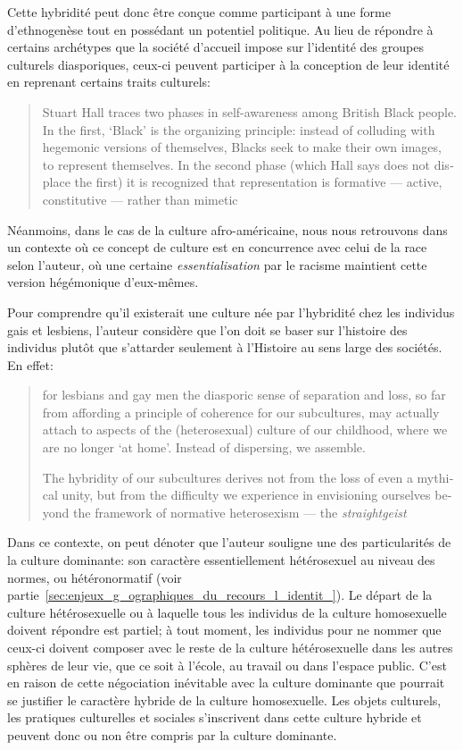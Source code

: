 Cette hybridité peut donc être conçue comme participant à une forme d'ethnogenèse tout en possédant un potentiel politique.
Au lieu de répondre à certains archétypes que la société d'accueil impose sur l'identité des groupes culturels diasporiques, ceux-ci peuvent participer à la conception de leur identité en reprenant certains traits culturels:
\foreignblockquote{english}[{\cite[277]{Sinfield1996}}][.]{Stuart Hall traces two phases in self-awareness among British Black people. In the first, `Black' is the organizing principle: instead of colluding with hegemonic versions of themselves, Blacks seek to make their own images, to represent themselves. In the second phase (which Hall says does not displace the first) it is recognized that representation is formative --- active, constitutive --- rather than mimetic}.
Néanmoins, dans le cas de la culture afro-américaine, nous nous retrouvons dans un contexte où ce concept de culture est en concurrence avec celui de la race selon l'auteur, où une certaine \emph{essentialisation} par le racisme maintient cette version hégémonique d'eux-mêmes.


Pour comprendre qu'il existerait une culture née par l'hybridité chez les individus gais et lesbiens, l'auteur considère que l'on doit se baser sur l'histoire des individus plutôt que s'attarder seulement à l'Histoire au sens large des sociétés.
En effet: \foreignblockquote{english}[{\cite[280]{Sinfield1996}}][.]{\textelp{} for lesbians and gay men the diasporic sense of separation and loss, so far from affording a principle of coherence for our subcultures, may actually attach to aspects of the (heterosexual) culture of our childhood, where we are no longer `at home'. Instead of dispersing, we assemble.

The hybridity of our subcultures derives not from the loss of even a mythical unity, but from the difficulty we experience in envisioning ourselves beyond the framework of normative heterosexism --- the \emph{straightgeist} \textelp{}}
Dans ce contexte, on peut dénoter que l'auteur souligne une des particularités de la culture dominante: son caractère essentiellement hétérosexuel au niveau des normes, ou hétéronormatif (voir partie~\ref{sec:enjeux_g_ographiques_du_recours_l_identit_}).
Le départ de la culture hétérosexuelle ou  à laquelle tous les individus de la culture homosexuelle doivent répondre est partiel; à tout moment, les individus \lgbt{} pour ne nommer que ceux-ci doivent composer avec le reste de la culture hétérosexuelle dans les autres sphères de leur vie, que ce soit à l'école, au travail ou dans l'espace public.
C'est en raison de cette négociation inévitable avec la culture dominante que pourrait se justifier le caractère hybride de la culture homosexuelle.
Les objets culturels, les pratiques culturelles et sociales s'inscrivent dans cette culture hybride et peuvent donc ou non être compris par la culture dominante.

